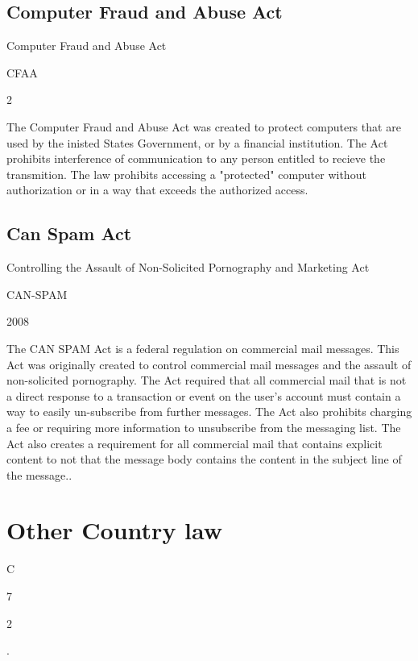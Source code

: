 \documentclass[14pt]{article}
\begin{document}
\subsection{Computer Fraud and Abuse Act}
    \begin{description}[leftmargin=!, labelwidth=\widthof{\bfseries Year Approved}]
        \item [Name] Computer Fraud and Abuse Act
        \item [Abbreviation] CFAA
        \item [Year Approved] 2
        \item [Description]The Computer Fraud and Abuse Act was created to protect computers that are used by the inisted States Government, or by a financial institution. The Act prohibits interference of communication to any person entitled to recieve the transmition. The law prohibits accessing a "protected" computer without authorization or in a way that exceeds the authorized access.  \cite{CFAA}
    \end{description}
\subsection{Can Spam Act}
    \begin{description}[leftmargin=!, labelwidth=\widthof{\bfseries Year Approved}]
        \item [Name] Controlling the Assault of Non-Solicited Pornography and Marketing Act
        \item [Abbreviation] CAN-SPAM
        \item [Year Approved] 2008
        \item [Description] The CAN SPAM Act is a federal regulation on commercial mail messages. This Act was originally created to control commercial mail messages and the assault of non-solicited pornography. The Act required that all commercial mail that is not a direct response to a transaction or event on the user's account must contain a way to easily un-subscribe from further messages. The Act also prohibits charging a fee or requiring more information to unsubscribe from the messaging list. The Act also creates a requirement for all commercial mail that contains explicit content to not that the message body contains the content in the subject line of the message.\cite{CANSPAM}.
    \end{description}
    
\section{Other Country law}
    \begin{description}[leftmargin=!, labelwidth=\widthof{\bfseries Year Approved}]
        \item [Name] C
        \item [Abbreviation] 7
        \item [Year Approved] 2
        \item [Description] \cite{GDPR}.
    \end{description}

\newpage


\end{document}
